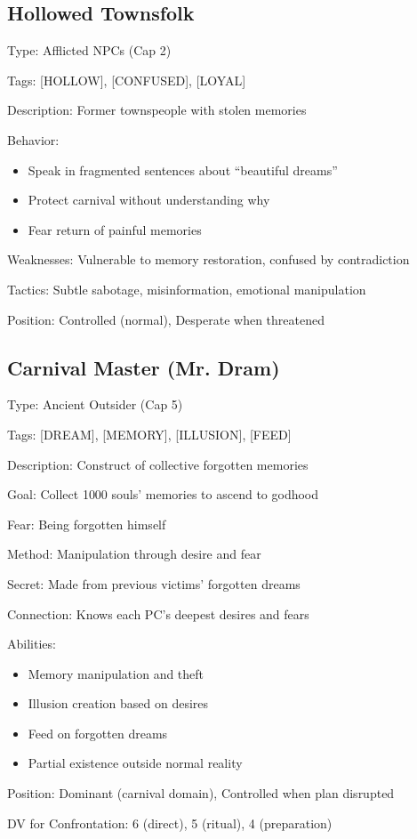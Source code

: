 \documentclass[11pt]{article}
\newenvironment{npc}[1]{\begin{description}[leftmargin=*,style=standard]\item[\textbf{#1}]}{\end{description}}
\begin{document}
\subsection{Hollowed Townsfolk}
\begin{npc}{Hollowed Townsfolk}
\item[Type:] Afflicted NPCs (Cap 2)
\item[Tags:] [HOLLOW], [CONFUSED], [LOYAL]
\item[Description:] Former townspeople with stolen memories
\item[Behavior:] 
  \begin{itemize}
    \item Speak in fragmented sentences about ``beautiful dreams''
    \item Protect carnival without understanding why
    \item Fear return of painful memories
  \end{itemize}
\item[Weaknesses:] Vulnerable to memory restoration, confused by contradiction
\item[Tactics:] Subtle sabotage, misinformation, emotional manipulation
\item[Position:] Controlled (normal), Desperate when threatened
\end{npc}

\subsection{Carnival Master (Mr. Dram)}
\begin{npc}{Carnival Master (Mr. Dram)}
\item[Type:] Ancient Outsider (Cap 5)
\item[Tags:] [DREAM], [MEMORY], [ILLUSION], [FEED]
\item[Description:] Construct of collective forgotten memories
\item[Goal:] Collect 1000 souls' memories to ascend to godhood
\item[Fear:] Being forgotten himself
\item[Method:] Manipulation through desire and fear
\item[Secret:] Made from previous victims' forgotten dreams
\item[Connection:] Knows each PC's deepest desires and fears
\item[Abilities:] 
  \begin{itemize}
    \item Memory manipulation and theft
    \item Illusion creation based on desires
    \item Feed on forgotten dreams
    \item Partial existence outside normal reality
  \end{itemize}
\item[Position:] Dominant (carnival domain), Controlled when plan disrupted
\item[DV for Confrontation:] 6 (direct), 5 (ritual), 4 (preparation)
\end{npc}
\end{document}
